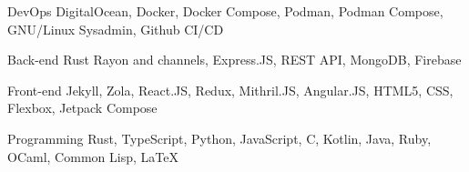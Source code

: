 

\begin{cvskills}

  \cvskill
    {DevOps} %
    {DigitalOcean, Docker, Docker Compose, Podman, Podman Compose, GNU/Linux Sysadmin, Github CI/CD} %

  \cvskill
    {Back-end} %
    {Rust Rayon and channels, Express.JS, REST API, MongoDB, Firebase} %

  \cvskill
    {Front-end} %
    {Jekyll, Zola, React.JS, Redux, Mithril.JS, Angular.JS, HTML5, CSS, Flexbox, Jetpack Compose} %

  \cvskill
    {Programming} %
    {Rust, TypeScript, Python, JavaScript, C, Kotlin, Java, Ruby, OCaml, Common Lisp, LaTeX} %

\end{cvskills}
